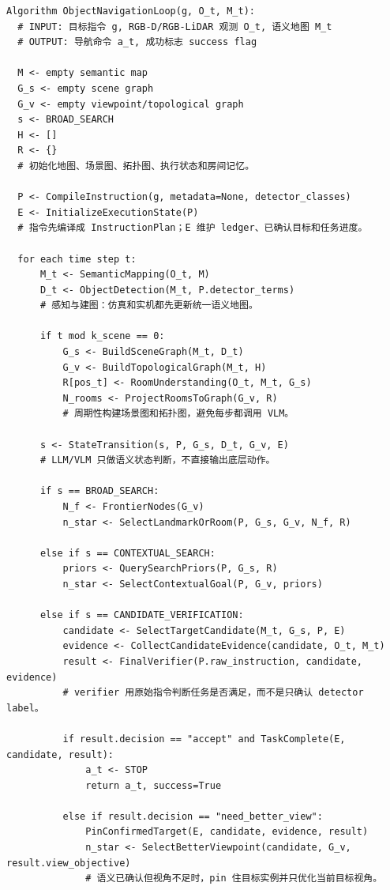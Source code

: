 \documentclass[UTF8,zihao=-4]{ctexart}
\begin{document}
\begin{lstlisting}[style=pseudo,caption={导航主循环}]
Algorithm ObjectNavigationLoop(g, O_t, M_t):
  # INPUT: 目标指令 g, RGB-D/RGB-LiDAR 观测 O_t, 语义地图 M_t
  # OUTPUT: 导航命令 a_t, 成功标志 success flag

  M <- empty semantic map
  G_s <- empty scene graph
  G_v <- empty viewpoint/topological graph
  s <- BROAD_SEARCH
  H <- []
  R <- {}
  # 初始化地图、场景图、拓扑图、执行状态和房间记忆。

  P <- CompileInstruction(g, metadata=None, detector_classes)
  E <- InitializeExecutionState(P)
  # 指令先编译成 InstructionPlan；E 维护 ledger、已确认目标和任务进度。

  for each time step t:
      M_t <- SemanticMapping(O_t, M)
      D_t <- ObjectDetection(M_t, P.detector_terms)
      # 感知与建图：仿真和实机都先更新统一语义地图。

      if t mod k_scene == 0:
          G_s <- BuildSceneGraph(M_t, D_t)
          G_v <- BuildTopologicalGraph(M_t, H)
          R[pos_t] <- RoomUnderstanding(O_t, M_t, G_s)
          N_rooms <- ProjectRoomsToGraph(G_v, R)
          # 周期性构建场景图和拓扑图，避免每步都调用 VLM。

      s <- StateTransition(s, P, G_s, D_t, G_v, E)
      # LLM/VLM 只做语义状态判断，不直接输出底层动作。

      if s == BROAD_SEARCH:
          N_f <- FrontierNodes(G_v)
          n_star <- SelectLandmarkOrRoom(P, G_s, G_v, N_f, R)

      else if s == CONTEXTUAL_SEARCH:
          priors <- QuerySearchPriors(P, G_s, R)
          n_star <- SelectContextualGoal(P, G_v, priors)

      else if s == CANDIDATE_VERIFICATION:
          candidate <- SelectTargetCandidate(M_t, G_s, P, E)
          evidence <- CollectCandidateEvidence(candidate, O_t, M_t)
          result <- FinalVerifier(P.raw_instruction, candidate, evidence)
          # verifier 用原始指令判断任务是否满足，而不是只确认 detector label。

          if result.decision == "accept" and TaskComplete(E, candidate, result):
              a_t <- STOP
              return a_t, success=True

          else if result.decision == "need_better_view":
              PinConfirmedTarget(E, candidate, evidence, result)
              n_star <- SelectBetterViewpoint(candidate, G_v, result.view_objective)
              # 语义已确认但视角不足时，pin 住目标实例并只优化当前目标视角。


\end{lstlisting}
\end{document}
